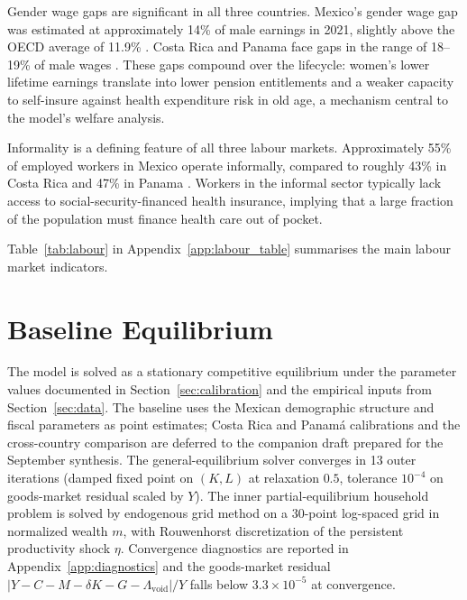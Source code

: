 \documentclass[12pt,a4paper]{article}
\begin{document}
Gender wage gaps are significant in all three countries. Mexico's
gender wage gap was estimated at approximately 14\% of male earnings in
2021, slightly above the OECD average of 11.9\% \citep{IMF2023}. Costa
Rica and Panama face gaps in the range of 18--19\% of male wages
\citep{ILOILOSTAT2023, WEFGGR2024}. These gaps compound over the
lifecycle: women's lower lifetime earnings translate into lower pension
entitlements and a weaker capacity to self-insure against health
expenditure risk in old age, a mechanism central to the model's welfare
analysis.

Informality is a defining feature of all three labour markets.
Approximately 55\% of employed workers in Mexico operate informally,
compared to roughly 43\% in Costa Rica and 47\% in Panama
\citep{ECLACILO2023}. Workers in the informal sector typically lack
access to social-security-financed health insurance, implying that a
large fraction of the population must finance health care out of
pocket. 

Table~\ref{tab:labour} in Appendix~\ref{app:labour_table} summarises the main labour market indicators.

\section{Baseline Equilibrium}
\label{sec:baseline}

The model is solved as a stationary competitive equilibrium under the
parameter values documented in Section~\ref{sec:calibration} and the
empirical inputs from Section~\ref{sec:data}. The baseline uses the
Mexican demographic structure and fiscal parameters as point estimates;
Costa Rica and Panam\'a calibrations and the cross-country comparison
are deferred to the companion draft prepared for the September synthesis.
The general-equilibrium solver converges in 13 outer iterations
(damped fixed point on $(K, L)$ at relaxation $0.5$, tolerance $10^{-4}$
on goods-market residual scaled by $Y$). The inner partial-equilibrium
household problem is solved by endogenous grid method on a $30$-point
log-spaced grid in normalized wealth $m$, with Rouwenhorst discretization
of the persistent productivity shock $\eta$. Convergence diagnostics are
reported in Appendix~\ref{app:diagnostics} and the goods-market residual
$|Y - C - M - \delta K - G - \Lambda_{\text{void}}|/Y$ falls below
$3.3 \times 10^{-5}$ at convergence.
\end{document}
